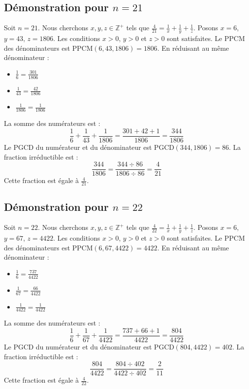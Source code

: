 \documentclass[11pt,a4paper]{article}
\begin{document}
\subsection{Démonstration pour $n = 21$}
Soit $n = 21$. Nous cherchons $x, y, z \in \mathbb{Z}^{+}$ tels que $\frac{4}{21} = \frac{1}{x} + \frac{1}{y} + \frac{1}{z}$.
Posons $x = 6$, $y = 43$, $z = 1806$.
Les conditions $x > 0$, $y > 0$ et $z > 0$ sont satisfaites.
Le PPCM des dénominateurs est $\text{PPCM}(6, 43, 1806) = 1806$.
En réduisant au même dénominateur :
\begin{itemize}
    \item $\frac{1}{6} = \frac{301}{1806}$
    \item $\frac{1}{43} = \frac{42}{1806}$
    \item $\frac{1}{1806} = \frac{1}{1806}$
\end{itemize}
La somme des numérateurs est :
$$ \frac{1}{6} + \frac{1}{43} + \frac{1}{1806} = \frac{301 + 42 + 1}{1806} = \frac{344}{1806} $$
Le PGCD du numérateur et du dénominateur est $\text{PGCD}(344, 1806) = 86$.
La fraction irréductible est :
$$ \frac{344}{1806} = \frac{344 \div 86}{1806 \div 86} = \frac{4}{21} $$
Cette fraction est égale à $\frac{4}{21}$.

\subsection{Démonstration pour $n = 22$}
Soit $n = 22$. Nous cherchons $x, y, z \in \mathbb{Z}^{+}$ tels que $\frac{4}{22} = \frac{1}{x} + \frac{1}{y} + \frac{1}{z}$.
Posons $x = 6$, $y = 67$, $z = 4422$.
Les conditions $x > 0$, $y > 0$ et $z > 0$ sont satisfaites.
Le PPCM des dénominateurs est $\text{PPCM}(6, 67, 4422) = 4422$.
En réduisant au même dénominateur :
\begin{itemize}
    \item $\frac{1}{6} = \frac{737}{4422}$
    \item $\frac{1}{67} = \frac{66}{4422}$
    \item $\frac{1}{4422} = \frac{1}{4422}$
\end{itemize}
La somme des numérateurs est :
$$ \frac{1}{6} + \frac{1}{67} + \frac{1}{4422} = \frac{737 + 66 + 1}{4422} = \frac{804}{4422} $$
Le PGCD du numérateur et du dénominateur est $\text{PGCD}(804, 4422) = 402$.
La fraction irréductible est :
$$ \frac{804}{4422} = \frac{804 \div 402}{4422 \div 402} = \frac{2}{11} $$
Cette fraction est égale à $\frac{4}{22}$.
\end{document}
